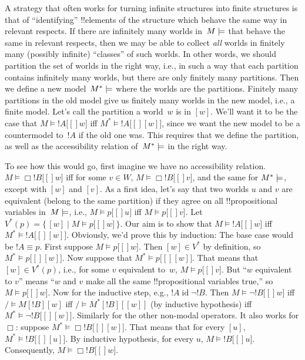 \documentclass[10pt,a4paper]{article}
\theoremstyle{plain}
\theoremstyle{definition}
\theoremstyle{remark}
\providecommand{\mSat}[3]{\ensuremath{#1 \models #2[#3]}}
\providecommand{\mModel}[2]{\ensuremath{#1 \models #2}}
\providecommand{\Setabs}[2]{\{\, #1 \mid #2 \,\}}
\providecommand{\ident}{\operatorname{id}}
\begin{document}
A strategy that often works for turning infinite structures into
finite structures is that of ``identifying'' !!{element}s of the
structure which behave the same way in relevant respects. If there are
infinitely many worlds in~$\mModel{M}$ that behave the same in
relevant respects, then we may be able to collect \emph{all} worlds in
finitely many (possibly infinite) ``classes'' of such worlds. In other
words, we should partition the set of worlds in the right way, i.e.,
in such a way that each partition contains infinitely many worlds, but
there are only finitely many partitions. Then we define a new
model~$\mModel{M^*}$ where the worlds are the partitions. Finitely
many partitions in the old model give us finitely many worlds in the
new model, i.e., a finite model. Let's call the partition a world~$w$
is in $[w]$. We'll want it to be the case that $\mSat{M}{!A}[w]$ iff
$\mSat{M^*}{!A}[{[w]}]$, since we want the new model to be a
countermodel to~$!A$ if the old one was. This requires that we define
the partition, as well as the accessibility relation of~$\mModel{M^*}$
in the right way.

To see how this would go, first imagine we have no accessibility
relation. $\mSat{M}{\Box !B}[w]$ iff for some $v \in W$,
$\mSat{M}{\Box !B}[v]$, and the same for $\mModel{M^*}$, except with
$[w]$ and $[v]$. As a first idea, let's say that two worlds $u$ and
$v$ are equivalent (belong to the same partition) if they agree on all
!!{propositional variable}s in~$\mModel{M}$, i.e., $\mSat{M}{p}[u]$
iff $\mSat{M}{p}[v]$. Let $V^*(p) = \Setabs{[w]}{\mSat{M}{p}[w]}$.
Our aim is to show that $\mSat{M}{!A}[w]$ iff
$\mSat{M^*}{!A}[{[w]}]$. Obviously, we'd prove this by induction: The
base case would be $!A \equiv p$. First suppose $\mSat{M}{p}[w]$. Then
$[w] \in V^*$ by definition, so $\mSat{M^*}{p}[{[w]}]$. Now suppose
that $\mSat{M^*}{p}[{[w]}]$. That means that $[w] \in V^*(p)$, i.e.,
for some $v$ equivalent to~$w$, $\mSat{M}{p}[v]$. But ``$w$ equivalent
to $v$'' means ``$w$ and $v$ make all the same !!{propositional variable}s
true,'' so $\mSat{M}{p}[w]$. Now for the inductive step, e.g., $!A
\ident \lnot !B$. Then $\mSat{M}{\lnot !B}[w]$ iff $\mSat/{M}{!B}[w]$
iff $\mSat/{M^*}{!B}[{[w]}]$ (by inductive hypothesis) iff
$\mSat{M^*}{\lnot !B}[{[w]}]$. Similarly for the other non-modal
operators. It also works for $\Box$: suppose $\mSat{M^*}{\Box
  !B}[{[w]}]$. That means that for every $[u]$,
$\mSat{M^*}{!B}[{[u]}]$. By inductive hypothesis, for every $u$,
$\mSat{M}{!B}[u]$. Consequently, $\mSat{M}{\Box !B}[w]$.
\end{document}
